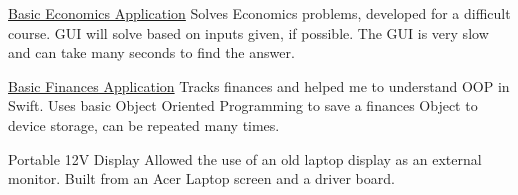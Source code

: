 \documentclass[10pt,letterpaper]{article}
\newenvironment{indentsection}[1]%
{\begin{list}{}%
	{\setlength{\leftmargin}{#1}}%
	\item[]%
}
{\end{list}}
\begin{document}
\begin{indentsection}{\parindent}
\begin{description*}
	\item[\href{https://github.com/jeremyggiese/jgieseRepo/tree/master/Economics}{Basic Economics Application}]
	Solves Economics problems, developed for a difficult course. GUI will solve based on inputs given, if possible. The GUI is very slow and can take many seconds to find the answer.
	\item[\href{https://github.com/jeremyggiese/jgieseRepo/tree/master/iOS/Finances}{Basic Finances Application}]
	Tracks finances and helped me to understand OOP in Swift. Uses basic Object Oriented Programming to save a finances Object to device storage, can be repeated many times.
	\item[Portable 12V Display]
	Allowed the use of an old laptop display as an external monitor. Built from an Acer Laptop screen and a driver board.
		
\end{description*}
\end{indentsection}

%
\end{document}
